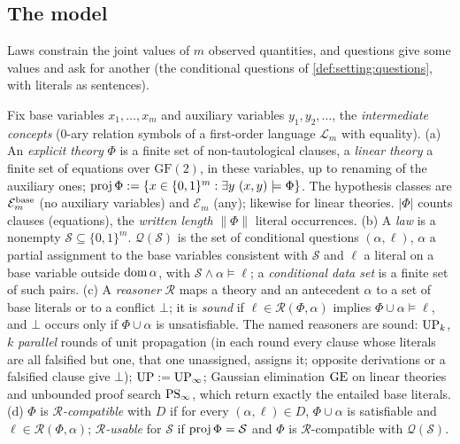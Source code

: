 \subsection{The model}\label{sec:shape:model}

Laws constrain the joint values of $m$ observed quantities, and questions give some values and ask for another (the conditional questions of \cref{def:setting:questions}, with literals as sentences).

\begin{definition}\label{def:shape:model}
Fix base variables $x_1,\dots,x_m$ and auxiliary variables $y_1,y_2,\dots$, the \emph{intermediate concepts} (0-ary relation symbols of a first-order language $\mathcal L_m$ with equality).
(a) An \emph{explicit theory} $\Phi$ is a finite set of non-tautological clauses, a \emph{linear theory} a finite set of equations over $\mathrm{GF}(2)$, in these variables, up to renaming of the auxiliary ones; $\proj\Phi:=\{x\in\{0,1\}^m:\exists y\ (x,y)\models\Phi\}$. The hypothesis classes are $\mathcal E^{\rm base}_m$ (no auxiliary variables) and $\mathcal E_m$ (any); likewise for linear theories. $\lvert\Phi\rvert$ counts clauses (equations), the \emph{written length} $\lVert\Phi\rVert$ literal occurrences.
(b) A \emph{law} is a nonempty $\mathcal S\subseteq\{0,1\}^m$. $\mathcal Q(\mathcal S)$ is the set of conditional questions $(\alpha,\ell)$, $\alpha$ a partial assignment to the base variables consistent with $\mathcal S$ and $\ell$ a literal on a base variable outside $\operatorname{dom}\alpha$, with $\mathcal S\wedge\alpha\models\ell$; a \emph{conditional data set} is a finite set of such pairs.
(c) A \emph{reasoner} $\mathcal R$ maps a theory and an antecedent $\alpha$ to a set of base literals or to a conflict $\bot$; it is \emph{sound} if $\ell\in\mathcal R(\Phi,\alpha)$ implies $\Phi\cup\alpha\models\ell$, and $\bot$ occurs only if $\Phi\cup\alpha$ is unsatisfiable. The named reasoners are sound: $\mathrm{UP}_k$, $k$ \emph{parallel} rounds of unit propagation (in each round every clause whose literals are all falsified but one, that one unassigned, assigns it; opposite derivations or a falsified clause give $\bot$); $\mathrm{UP}:=\mathrm{UP}_\infty$; Gaussian elimination $\mathrm{GE}$ on linear theories and unbounded proof search $\mathrm{PS}_\infty$, which return exactly the entailed base literals.
(d) $\Phi$ is \emph{$\mathcal R$-compatible} with $D$ if for every $(\alpha,\ell)\in D$, $\Phi\cup\alpha$ is satisfiable and $\ell\in\mathcal R(\Phi,\alpha)$; \emph{$\mathcal R$-usable} for $\mathcal S$ if $\operatorname{proj}\Phi=\mathcal S$ and $\Phi$ is $\mathcal R$-compatible with $\mathcal Q(\mathcal S)$.

\end{definition}

